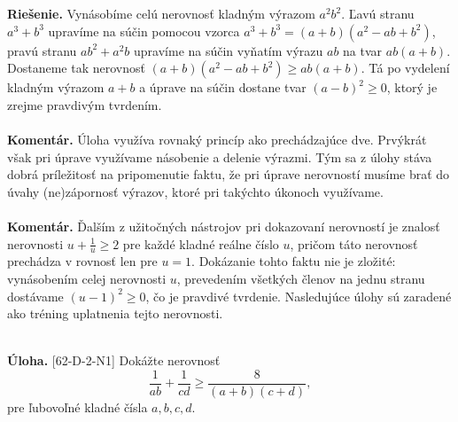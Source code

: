 \documentclass[11pt,a4paper,oneside,final]{book}
\newcommand{\kom}{\textbf{Komentár.} }
\newcommand{\ul}{\textbf{Úloha.} }
\newcommand{\rie}{\textbf{Riešenie.} }
\begin{document}
\rie Vynásobíme celú nerovnosť kladným výrazom $a^2b^2$. Ľavú stranu $a^3+b^3$ upravíme na súčin pomocou vzorca $a^3+b^3=(a+b)(a^2-ab+b^2)$, pravú stranu $ab^2+a^2b$ upravíme na súčin vyňatím výrazu $ab$ na tvar $ab(a+b)$. Dostaneme tak nerovnosť $(a+b)(a^2-ab+b^2)\geq ab(a+b)$. Tá po vydelení kladným výrazom  $a + b$ a úprave na súčin dostane tvar $(a - b)^2\geq 0$, ktorý je zrejme pravdivým tvrdením. \\
\\
\kom Úloha využíva rovnaký princíp ako prechádzajúce dve. Prvýkrát však pri úprave využívame násobenie a delenie výrazmi. Tým sa z úlohy stáva dobrá príležitosť na pripomenutie faktu, že pri úprave nerovností musíme brať do úvahy (ne)zápornosť výrazov, ktoré pri takýchto úkonoch využívame.\\
\\
\kom Ďalším z užitočných nástrojov pri dokazovaní nerovností je znalosť nerovnosti $u+\frac{1}{u}\geq 2$ pre každé kladné reálne číslo $u$, pričom táto nerovnosť prechádza v rovnosť len pre $u=1$. Dokázanie tohto faktu nie je zložité: vynásobením celej nerovnosti $u$, prevedením všetkých členov na jednu stranu dostávame $(u-1)^2\geq 0$, čo je pravdivé tvrdenie. Nasledujúce úlohy sú zaradené ako tréning uplatnenia tejto nerovnosti.\\
\\
\begin{tcolorbox}[breakable,notitle,boxrule=0pt,colback=light-gray,colframe=light-gray]\ul [62-D-2-N1] Dokážte nerovnosť $$\frac{1}{ab}+\frac{1}{cd}\geq \frac{8}{(a+b)(c+d)},$$ pre ľubovoľné kladné čísla $a, b, c, d$.

\end{tcolorbox}
\end{document}

